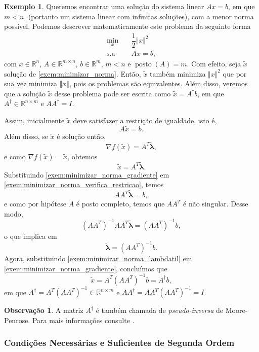\documentclass[12pt,a4paper]{scrartcl}
\DeclareMathOperator{\posto}{posto}
\def\RR{\mathds{R}}
\theoremstyle{definition}%
\newtheorem{exem}{Exemplo}
\newtheorem{obs}{Observação}
\begin{document}
\begin{exem}
Queremos encontrar uma solução do sistema linear $Ax =b$, em que $m<n$, (portanto um sistema linear com infinitas soluções), com a menor norma possível. Podemos descrever matematicamente este problema da seguinte forma
\[\begin{aligned} \label{exem:minimizar_norma}
\min_{x} & \quad \dfrac{1}{2}\Vert x \Vert^{2} \\
\text{s.a} & \quad Ax=b,
\end{aligned} \]
com $x \in \RR^{n}$, $A \in \RR^{m\times n}$, $b\in \RR^{m}$, $m<n$ e $\posto (A)=m$. Com efeito, seja $\tilde{x}$ solução de \eqref{exem:minimizar_norma}. Então, $\tilde{x}$ também minimiza $\Vert x \Vert^{2}$ que por sua vez minimiza $\Vert x \Vert$, pois os problemas são equivalentes. Além disso, veremos que a solução $\tilde{x}$ desse problema pode ser escrita como $\tilde{x} = A^{\dag}b$, em que $A^{\dag} \in \RR^{n\times m}$ e $AA^{\dag} =I$.
\end{exem}
Assim, inicialmente $\tilde{x}$ deve satisfazer a restrição de igualdade, isto é,
\[ \label{exem:minimizar_norma_verifica_restricao}
A\tilde{x} = b .
\]
Além disso, se $\tilde{x}$ é solução então,
\[
\nabla f(\tilde{x}) =A^{T} \tilde{\boldsymbol{\lambda}},
\]
e como $\nabla f(\tilde{x}) = \tilde{x}$, obtemos 
\[ \label{exem:minimizar_norma_gradiente}
\tilde{x} = A^{T} \tilde{\boldsymbol{\lambda}} .
\]
Substituindo \eqref{exem:minimizar_norma_gradiente} em \eqref{exem:minimizar_norma_verifica_restricao}, temos
\[
AA^{T} \tilde{\boldsymbol{\lambda}} = b,
\]
e como por hipótese $A$ é posto completo, temos que $AA^{T}$ é não singular. Desse modo,
\[
(AA^{T})^{-1} AA^{T} \tilde{\boldsymbol{\lambda}} = (AA^{T})^{-1} b,
\]
o que implica em 
\[ \label{exem:minimizar_norma_lambdatil}
\tilde{\boldsymbol{\lambda}} = (AA^{T})^{-1} b.
\]
Agora, substituindo \eqref{exem:minimizar_norma_lambdatil} em \eqref{exem:minimizar_norma_gradiente}, concluímos que
\[
\tilde{x} = A^{T}(AA^{T})^{-1}b = A^{\dag} b,
\]
em que $A^{\dag} = A^{T}(AA^{T})^{-1} \in \RR^{n\times m}$ e $AA^{\dag} = AA^{T}(AA^{T})^{-1} = I$.

\begin{obs}
A matriz $A^{\dag}$ é também chamada de \emph{pseudo-inversa} de Moore-Penrose. Para mais informações consulte \textcite[p.423]{meyer2000matrix}.
\end{obs}


\subsubsection{Condições Necessárias e Suficientes de Segunda Ordem} \label{subsubsection:condicao_2ordem_igualdade}
\end{document}

